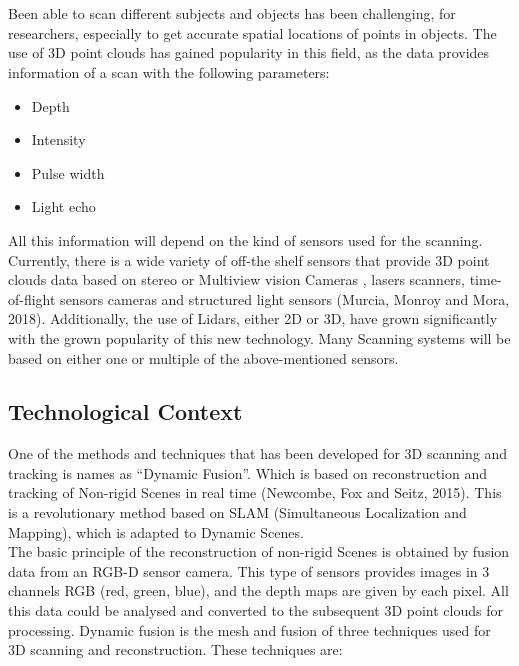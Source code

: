\documentclass[a4paper]{thesis}
\begin{document}
\section*{}
Been able to scan different subjects and objects has been challenging, for researchers, especially to get accurate spatial locations of points in objects. The use of 3D point clouds has gained popularity in this field, as the data provides information of a scan with the following parameters: 
\begin{itemize}[]
    \itemsep0em 
    \item Depth
    \item Intensity
    \item Pulse width
    \item Light echo
\end{itemize}
All this information will depend on the kind of sensors used for the scanning. Currently, there is a wide variety of off-the shelf sensors that provide 3D point clouds data based on stereo or Multiview vision Cameras , lasers scanners, time-of-flight sensors cameras and structured light sensors (Murcia, Monroy and Mora, 2018). 
Additionally, the use of Lidars, either 2D or 3D, have grown significantly with the grown popularity of this new technology.
Many Scanning systems will be based on either one or multiple of the above-mentioned sensors. 

\subsection*{Technological Context}
One of the methods and techniques that has been developed for 3D scanning and tracking is names as “Dynamic Fusion”. Which is based on reconstruction and tracking of Non-rigid Scenes in real time (Newcombe, Fox and Seitz, 2015).
This is a revolutionary method based on SLAM (Simultaneous Localization and Mapping), which is adapted to Dynamic Scenes.\\[10pt]
The basic principle of the reconstruction of non-rigid Scenes is obtained by fusion data from an RGB-D sensor camera.
This type of sensors provides images in 3 channels RGB (red, green, blue), and the depth maps are given by each pixel. 
All this data could be analysed and converted to the subsequent 3D point clouds for processing.
Dynamic fusion is the mesh and fusion of three techniques used for 3D scanning and reconstruction.  These techniques are:
\end{document}
